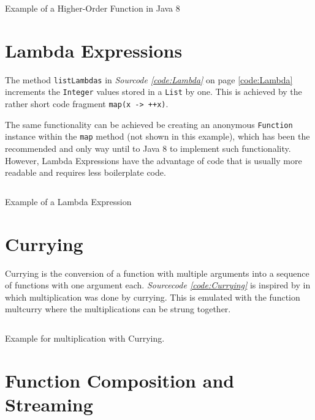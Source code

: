 \documentclass[a4paper,12pt,twoside]{scrreprt}
\begin{document}
\begin{listing}[ht]
    \inputminted[fontsize=\footnotesize,linenos,breaklines,breakanywhere]{java}{./code/HigherOrderFunctions.java}
    \caption[Example of a Higher-Order Function in Java 8]{Example of a Higher-Order Function in Java 8}
    \label{code:higherordered}
\end{listing}

\section{Lambda Expressions}
The method \texttt{listLambdas} in \textit{Sourcode \ref{code:Lambda}} on page \ref{code:Lambda} increments the \texttt{Integer} values stored in a \texttt{List} by one. This is achieved by the rather short code fragment \texttt{map(x -> ++x)}.

The same functionality can be achieved be creating an anonymous \texttt{Function} instance within the \texttt{map} method (not shown in this example), which has been the recommended and only way until to Java 8 to implement such functionality. However, Lambda Expressions have the advantage of code that is usually more readable and requires less boilerplate code.

\begin{listing}[ht]
    \inputminted[fontsize=\footnotesize,linenos]{java}{./code/LambdaExpressions.java}
    \caption[Example of a Lambda Expression]{Example of a Lambda Expression}
    \label{code:Lambda}
\end{listing}

\section{Currying}
Currying is the conversion of a function with multiple arguments into a sequence of functions with one argument each. \emph{Sourcecode \ref{code:Currying}} is inspired by \cite{Robertson_currying_2018} in which multiplication was done by currying. This is emulated with the function multcurry where the multiplications can be strung together.
\begin{listing}[ht]
    \inputminted[fontsize=\footnotesize,linenos]{java}{./code/Currying.java}
    \caption[Example for Currying]{Example for multiplication with Currying.}
    \label{code:Currying}
\end{listing}
\clearpage

\section{Function Composition and Streaming}
\end{document}
